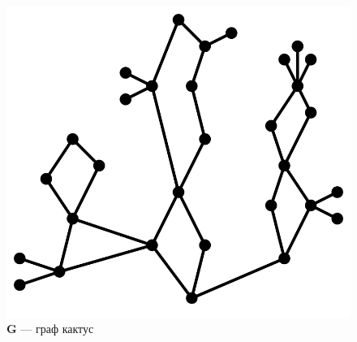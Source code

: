 \begin{figure}[H]
    \centering
    \includegraphics[width=0.45\linewidth]{pictures/Cactus.png}
    \caption{\textbf{G} --- граф кактус}
    \label{Cactus:image}
\end{figure}